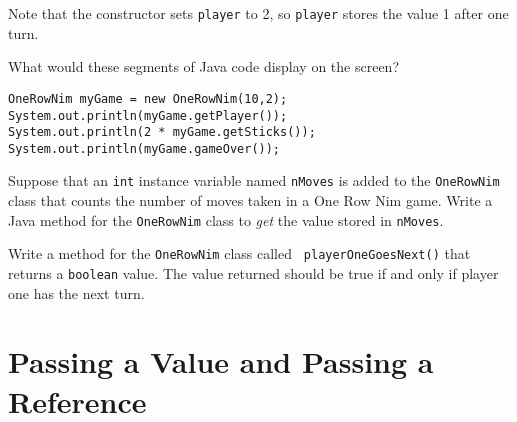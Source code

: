 \noindent Note that the constructor sets {\tt player} to 2, so
{\tt player} stores the value 1 after one turn.

\begin{SSTUDY}
\item  What would these segments of Java
code display on the screen?

\begin{jjjlisting}
\begin{lstlisting}
OneRowNim myGame = new OneRowNim(10,2);
System.out.println(myGame.getPlayer());
System.out.println(2 * myGame.getSticks());
System.out.println(myGame.gameOver());
\end{lstlisting}
\end{jjjlisting}


\item  Suppose that an {\tt int} instance variable named {\tt nMoves} is added
to the {\tt OneRowNim} class that counts the number of moves taken in a
One Row Nim game.  Write a Java method for the {\tt OneRowNim} class
to {\it get}
the value stored in {\tt nMoves}.

\item  Write a method for the {\tt OneRowNim} class called {\tt
player\-One\-Goes\-Next()}
that returns a {\tt boolean} value.  The value returned should be
true if and only
if player one has the next turn.

\end{SSTUDY}

\section{Passing a Value and Passing a Reference}
\label{sec-passby}


